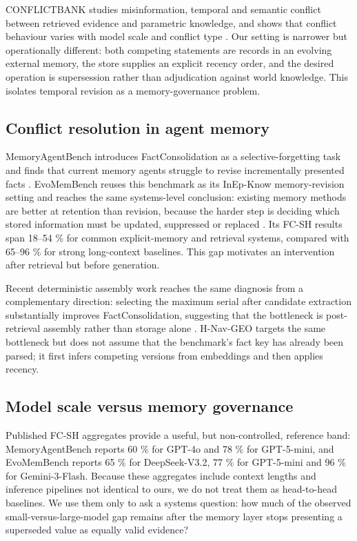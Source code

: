 \documentclass[journal=jcisd8,manuscript=article]{achemso}
\begin{document}
CONFLICTBANK studies misinformation, temporal and semantic conflict between retrieved evidence and parametric knowledge, and shows that conflict behaviour varies with model scale and conflict type \cite{su2024conflictbank}. Our setting is narrower but operationally different: both competing statements are records in an evolving external memory, the store supplies an explicit recency order, and the desired operation is supersession rather than adjudication against world knowledge. This isolates temporal revision as a memory-governance problem.

\subsection{Conflict resolution in agent memory}

MemoryAgentBench introduces FactConsolidation as a selective-forgetting task and finds that current memory agents struggle to revise incrementally presented facts \cite{hu2026memoryagentbench}. EvoMemBench reuses this benchmark as its InEp-Know memory-revision setting and reaches the same systems-level conclusion: existing memory methods are better at retention than revision, because the harder step is deciding which stored information must be updated, suppressed or replaced \cite{wang2026evomembench}. Its FC-SH results span 18--54 \% for common explicit-memory and retrieval systems, compared with 65--96 \% for strong long-context baselines. This gap motivates an intervention after retrieval but before generation.

Recent deterministic assembly work reaches the same diagnosis from a complementary direction: selecting the maximum serial after candidate extraction substantially improves FactConsolidation, suggesting that the bottleneck is post-retrieval assembly rather than storage alone \cite{reddy2026freshness}. H-Nav-GEO targets the same bottleneck but does not assume that the benchmark's fact key has already been parsed; it first infers competing versions from embeddings and then applies recency.

\subsection{Model scale versus memory governance}

Published FC-SH aggregates provide a useful, but non-controlled, reference band: MemoryAgentBench reports 60 \% for GPT-4o and 78 \% for GPT-5-mini, and EvoMemBench reports 65 \% for DeepSeek-V3.2, 77 \% for GPT-5-mini and 96 \% for Gemini-3-Flash. Because these aggregates include context lengths and inference pipelines not identical to ours, we do not treat them as head-to-head baselines. We use them only to ask a systems question: how much of the observed small-versus-large-model gap remains after the memory layer stops presenting a superseded value as equally valid evidence?
\end{document}
